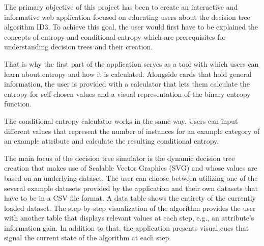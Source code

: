 
The primary objective of this project has been to create an interactive and informative web application focused on educating users about the decision tree algorithm ID3. To achieve this goal, the user would first have to be explained the concepts of entropy and conditional entropy which are prerequisites for understanding decision trees and their creation. 

That is why the first part of the application serves as a tool with which users can learn about entropy and how it is calculated. Alongside cards that hold general information, the user is provided with a calculator that lets them calculate the entropy for self-chosen values and a visual representation of the binary entropy function.

The conditional entropy calculator works in the same way. Users can input different values that represent the number of instances for an example category of an example attribute and calculate the resulting conditional entropy.

The main focus of the decision tree simulator is the dynamic decision tree creation that makes use of Scalable Vector Graphics (SVG) and whose values are based on an underlying dataset. The user can choose between utilizing one of the several example datasets provided by the application and their own datasets that have to be in a CSV file format. A data table shows the entirety of the currently loaded dataset. The step-by-step visualization of the algorithm provides the user with another table that displays relevant values at each step, e.g., an attribute's information gain. In addition to that, the application presents visual cues that signal the current state of the algorithm at each step.